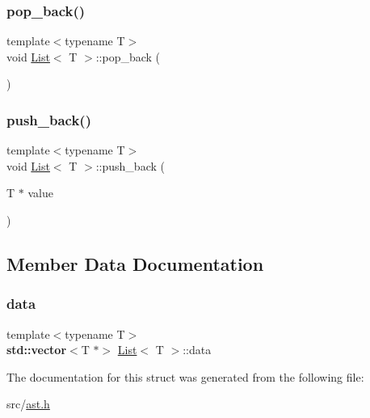 \subsubsection{\texorpdfstring{pop\+\_\+back()}{pop\_back()}}
{\footnotesize\ttfamily template$<$typename T$>$ \\
void \hyperlink{struct_list}{List}$<$ T $>$\+::pop\+\_\+back (\begin{DoxyParamCaption}{ }\end{DoxyParamCaption})\hspace{0.3cm}{\ttfamily [inline]}}

\mbox{\label{struct_list_af4ca3dd63fcff83845b673dfd7d5d715}} 
\subsubsection{\texorpdfstring{push\+\_\+back()}{push\_back()}}
{\footnotesize\ttfamily template$<$typename T$>$ \\
void \hyperlink{struct_list}{List}$<$ T $>$\+::push\+\_\+back (\begin{DoxyParamCaption}\item[{T $\ast$}]{value }\end{DoxyParamCaption})\hspace{0.3cm}{\ttfamily [inline]}}



\subsection{Member Data Documentation}
\mbox{\label{struct_list_afcdf492754937d2dbd6c1f89f8abf888}} 
\subsubsection{\texorpdfstring{data}{data}}
{\footnotesize\ttfamily template$<$typename T$>$ \\
\textbf{ std\+::vector}$<$T $\ast$$>$ \hyperlink{struct_list}{List}$<$ T $>$\+::data}



The documentation for this struct was generated from the following file\+:\begin{DoxyCompactItemize}
\item 
src/\hyperlink{ast_8h}{ast.\+h}\end{DoxyCompactItemize}
